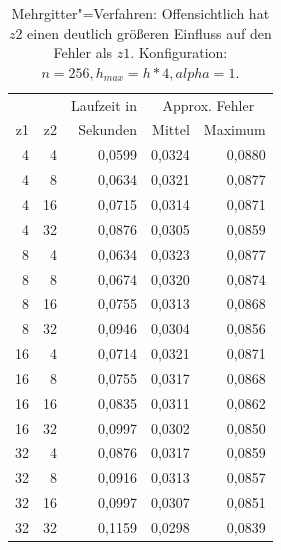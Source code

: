 \documentclass[paper = a4]{scrartcl}
\begin{document}
\begin{table}
    \centering
    \begin{tabular}{|r|r|r|r|r|} \hline
    & & Laufzeit in & \multicolumn{2}{c|}{Approx. Fehler} \\
    z1 & z2 & Sekunden & Mittel & Maximum \\ \hline \hline
    4  & 4  & 0,0599   & 0,0324 & 0,0880  \\
    4  & 8  & 0,0634   & 0,0321 & 0,0877  \\
    4  & 16 & 0,0715   & 0,0314 & 0,0871  \\
    4  & 32 & 0,0876   & 0,0305 & 0,0859  \\ \hline
    8  & 4  & 0,0634   & 0,0323 & 0,0877  \\
    8  & 8  & 0,0674   & 0,0320 & 0,0874  \\
    8  & 16 & 0,0755   & 0,0313 & 0,0868  \\
    8  & 32 & 0,0946   & 0,0304 & 0,0856  \\ \hline
    16 & 4  & 0,0714   & 0,0321 & 0,0871  \\
    16 & 8  & 0,0755   & 0,0317 & 0,0868  \\
    16 & 16 & 0,0835   & 0,0311 & 0,0862  \\
    16 & 32 & 0,0997   & 0,0302 & 0,0850  \\ \hline
    32 & 4  & 0,0876   & 0,0317 & 0,0859  \\
    32 & 8  & 0,0916   & 0,0313 & 0,0857  \\
    32 & 16 & 0,0997   & 0,0307 & 0,0851  \\
    32 & 32 & 0,1159   & 0,0298 & 0,0839  \\ \hline
    \end{tabular}
    \caption{Mehrgitter"=Verfahren: Offensichtlich hat \(z2\) einen deutlich größeren Einfluss auf den Fehler als \(z1\). Konfiguration: \(n=256, h_{max}=h*4, alpha=1\).}
    \label{tab:b}
\end{table}
\end{document}
